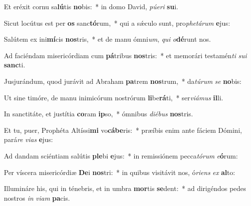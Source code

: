 \item Et eréxit cornu sa\textbf{lú}tis \textbf{no}bis:~* in domo David, \textit{pú}\textit{e}\textit{ri} \textbf{su}i.
\item Sicut locútus est per \textbf{os} sanc\textbf{tó}rum,~* qui a sǽculo sunt, pro\textit{phe}\textit{tá}\textit{rum} \textbf{e}jus:
\item Salútem ex ini\textbf{mí}cis \textbf{nos}tris,~* et de manu ómni\textit{um}, \textit{qui} \textit{o}\textbf{dé}runt nos.
\item Ad faciéndam misericórdiam cum \textbf{pá}tribus \textbf{nos}tris:~* et memorári testamén\textit{ti} \textit{su}\textit{i} \textbf{sanc}ti.
\item Jusjurándum, quod jurávit ad Abraham \textbf{pa}trem \textbf{nos}trum,~* da\textit{tú}\textit{rum} \textit{se} \textbf{no}bis:
\item Ut sine timóre, de manu inimicórum nostrórum \textbf{li}be\textbf{rá}ti,~* ser\textit{vi}\textit{á}\textit{mus} \textbf{il}li.
\item In sanctitáte, et justítia \textbf{co}ram \textbf{ip}so,~* ómnibus \textit{di}\textit{é}\textit{bus} \textbf{nos}tris.
\item Et tu, puer, Prophéta Altíssi\textbf{mi} vo\textbf{cá}\textbf{be}ris:~* præíbis enim ante fáciem Dómini, pará\textit{re} \textit{vi}\textit{as} \textbf{e}jus:
\item Ad dandam sciéntiam salútis \textbf{ple}bi \textbf{e}jus:~* in remissiónem pecca\textit{tó}\textit{rum} \textit{e}\textbf{ó}rum:
\item Per víscera misericórdiæ \textbf{De}i \textbf{nos}tri:~* in quibus visitávit nos, ó\textit{ri}\textit{ens} \textit{ex} \textbf{al}to:
\item Illumináre his, qui in ténebris, et in umbra \textbf{mor}tis \textbf{se}dent:~* ad dirigéndos pedes nostros \textit{in} \textit{vi}\textit{am} \textbf{pa}cis.
